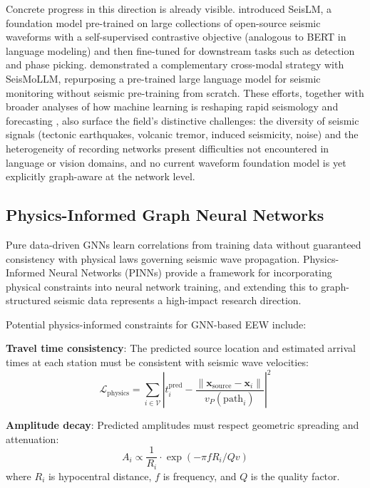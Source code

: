 \documentclass[review,authoryear]{elsarticle}
\begin{document}
Concrete progress in this direction is already visible. \citet{liu2024seislm} introduced SeisLM, a foundation model pre-trained on large collections of open-source seismic waveforms with a self-supervised contrastive objective (analogous to BERT in language modeling) and then fine-tuned for downstream tasks such as detection and phase picking. \citet{wang2025seismollm} demonstrated a complementary cross-modal strategy with SeisMoLLM, repurposing a pre-trained large language model for seismic monitoring without seismic pre-training from scratch. These efforts, together with broader analyses of how machine learning is reshaping rapid seismology and forecasting \citep{mousavi2022deep, beroza2021forecasting}, also surface the field's distinctive challenges: the diversity of seismic signals (tectonic earthquakes, volcanic tremor, induced seismicity, noise) and the heterogeneity of recording networks present difficulties not encountered in language or vision domains, and no current waveform foundation model is yet explicitly graph-aware at the network level.

\subsection{Physics-Informed Graph Neural Networks}

Pure data-driven GNNs learn correlations from training data without guaranteed consistency with physical laws governing seismic wave propagation. Physics-Informed Neural Networks (PINNs) \citep{raissi2019physics} provide a framework for incorporating physical constraints into neural network training, and extending this to graph-structured seismic data represents a high-impact research direction.

Potential physics-informed constraints for GNN-based EEW include:

\textbf{Travel time consistency}: The predicted source location and estimated arrival times at each station must be consistent with seismic wave velocities:
\begin{equation}
\mathcal{L}_{\text{physics}} = \sum_{i \in \mathcal{V}} \left| t_i^{\text{pred}} - \frac{\|\mathbf{x}_{\text{source}} - \mathbf{x}_i\|}{v_P(\text{path}_i)} \right|^2
\end{equation}

\textbf{Amplitude decay}: Predicted amplitudes must respect geometric spreading and attenuation:
\begin{equation}
A_i \propto \frac{1}{R_i} \cdot \exp(-\pi f R_i / Q v)
\end{equation}
where $R_i$ is hypocentral distance, $f$ is frequency, and $Q$ is the quality factor.
\end{document}
